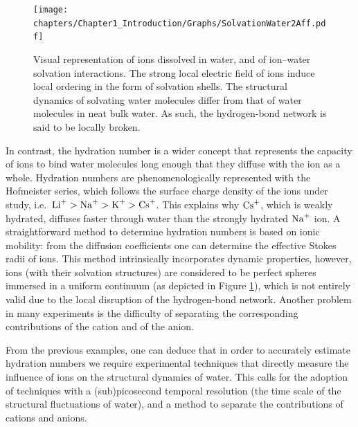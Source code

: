 \begin{figure}[t!]
	\centering
	\texttt{[image: chapters/Chapter1\_Introduction/Graphs/SolvationWater2Aff.pdf]} %
	\caption{Visual representation of ions dissolved in water, and of ion--water solvation interactions. The strong local electric field of ions induce local ordering in the form of solvation shells. The structural dynamics of solvating water molecules differ from that of water molecules in neat bulk water. As such, the hydrogen-bond network is said to be locally broken.}
	\label{SolvationWaterSchematic}
\end{figure}


In contrast, the hydration number is a wider concept that represents the capacity of ions to bind water molecules long enough that they diffuse with the ion as a whole. Hydration numbers are phenomenologically represented with the Hofmeister series, which follows the surface charge density of the ions under study, i.e.\ $\ce{Li+} > \ce{Na+} > \ce{K+} > \ce{Cs+}$. This explains why $\ce{Cs+}$, which is weakly hydrated, diffuses faster through water than the strongly hydrated $\ce{Na+}$ ion.\!\cite{Cota2018} A straightforward method to determine hydration numbers is based on ionic mobility: from the diffusion coefficients one can determine the effective Stokes radii of ions.\!\cite{Atkins2010} This method intrinsically incorporates dynamic properties, however, ions (with their solvation structures) are considered to be perfect spheres immersed in a uniform continuum (as depicted in Figure \ref{SolvationWaterSchematic}), which is not entirely valid due to the local disruption of the hydrogen-bond network. Another problem in many experiments is the difficulty of separating the corresponding contributions of the cation and of the anion.


From the previous examples, one can deduce that in order to accurately estimate hydration numbers we require experimental techniques that directly measure the influence of ions on the structural dynamics of water. This calls for the adoption of techniques with a (sub)picosecond temporal resolution (the time scale of the structural fluctuations of water), and a method to separate the contributions of cations and anions.











